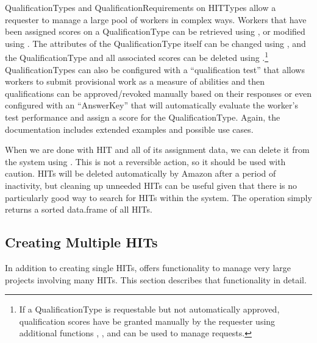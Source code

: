 QualificationTypes and QualificationRequirements on HITTypes allow a requester to manage a large pool of workers in complex ways. Workers that have been assigned scores on a QualificationType can be retrieved using , or modified using . The attributes of the QualificationType itself can be changed using , and the QualificationType and all associated scores can be deleted using .\footnote{If a QualificationType is requestable but not automatically approved, qualification scores have be granted manually by the requester using additional functions , , and  can be used to manage requests.} QualificationTypes can also be configured with a ``qualification test'' that allows workers to submit provisional work as a measure of abilities and then qualifications can be approved/revoked manually based on their responses or even configured with an ``AnswerKey'' that will automatically evaluate the worker's test performance and assign a score for the QualificationType. Again, the  documentation includes extended examples and possible use cases.

When we are done with HIT and all of its assignment data, we can delete it from the system using . This is not a reversible action, so it should be used with caution. HITs will be deleted automatically by Amazon after a period of inactivity, but cleaning up unneeded HITs can be useful given that there is no particularly good way to search for HITs within the system. The  operation simply returns a sorted data.frame of all HITs.


\subsection{Creating Multiple HITs}

In addition to creating single HITs,  offers functionality to manage very large projects involving many HITs. This section describes that functionality in detail.


